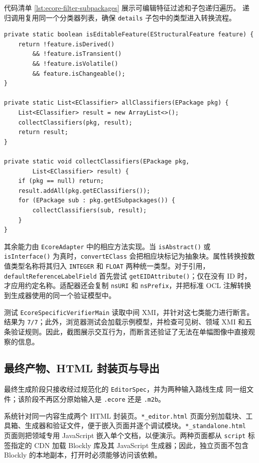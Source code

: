 代码清单 \ref{lst:ecore-filter-subpackages} 展示可编辑特征过滤和子包递归遍历。
递归调用复用同一个分类器列表，确保 \texttt{details} 子包中的类型进入转换流程。

\begin{lstlisting}[style=tfmjavaecore, captionpos=t, caption={可编辑特征过滤与 Ecore 子包遍历}, label={lst:ecore-filter-subpackages}]
private static boolean isEditableFeature(EStructuralFeature feature) {
    return !feature.isDerived()
        && !feature.isTransient()
        && !feature.isVolatile()
        && feature.isChangeable();
}

private static List<EClassifier> allClassifiers(EPackage pkg) {
    List<EClassifier> result = new ArrayList<>();
    collectClassifiers(pkg, result);
    return result;
}

private static void collectClassifiers(EPackage pkg,
        List<EClassifier> result) {
    if (pkg == null) return;
    result.addAll(pkg.getEClassifiers());
    for (EPackage sub : pkg.getESubpackages()) {
        collectClassifiers(sub, result);
    }
}
\end{lstlisting}

其余能力由 \texttt{EcoreAdapter} 中的相应方法实现。当 \texttt{isAbstract()} 或 \texttt{isInterface()} 为真时，\texttt{convertEClass} 会把相应块标记为抽象块。属性转换按数值类型名称将其归入 \texttt{INTEGER} 和 \texttt{FLOAT} 两种统一类型。对于引用，\texttt{defaultReferenceLabelField} 首先尝试 \texttt{getEIDAttribute()}；仅在没有 ID 时，才应用约定名称。适配器还会复制 \texttt{nsURI} 和 \texttt{nsPrefix}，并把标准 OCL 注解转换到生成器使用的同一个验证模型中。

测试 \texttt{EcoreSpecificVerifierMain} 读取中间 XMI，并针对这七类能力进行断言。结果为 \texttt{7/7}；此外，浏览器测试会加载示例模型，并检查可见树、领域 XMI 和五条验证规则。因此，截图展示交互行为，而断言还验证了无法在单幅图像中直接观察的信息。
\FloatBarrier

\subsection{最终产物、HTML 封装页与导出}

最终生成阶段只接收经过规范化的 \texttt{EditorSpec}，并为两种输入路线生成
同一组文件；该阶段不再区分原始输入是 \texttt{.ecore} 还是 \texttt{.m2b}。

系统针对同一内容生成两个 HTML 封装页。\texttt{*\_editor.}\allowbreak\texttt{html} 页面分别加载块、工具箱、生成器和验证文件，便于嵌入页面并逐个调试模块。\texttt{*\_standalone.html} 页面则把领域专用 JavaScript 嵌入单个文档，以便演示。两种页面都从 \texttt{script} 标签指定的 CDN 加载 Blockly 库及其 JavaScript 生成器；因此，独立页面不包含 Blockly 的本地副本，打开时必须能够访问该依赖。


